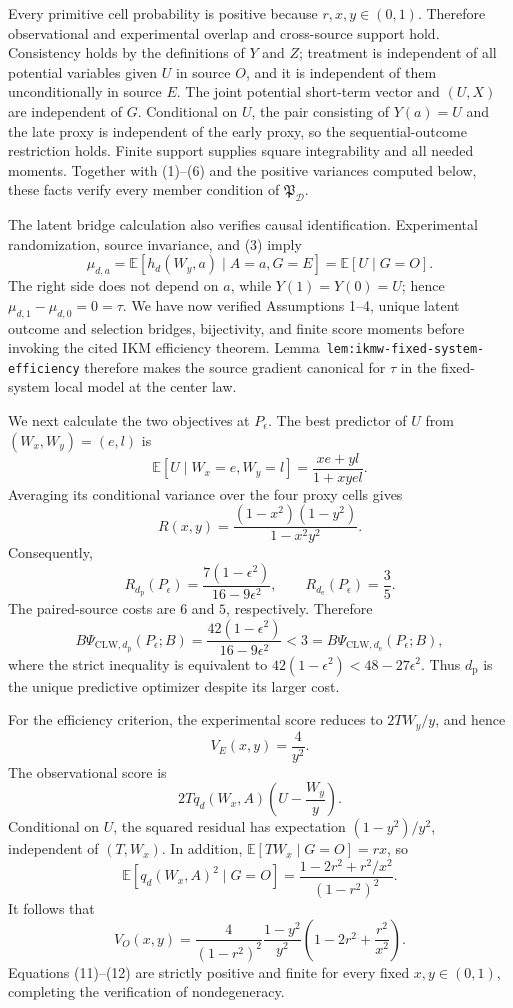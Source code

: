 Every primitive cell probability is positive because \(r,x,y\in(0,1)\).  Therefore observational and experimental overlap and cross-source support hold.  Consistency holds by the definitions of \(Y\) and \(Z\); treatment is independent of all potential variables given \(U\) in source \(O\), and it is independent of them unconditionally in source \(E\).  The joint potential short-term vector and \((U,X)\) are independent of \(G\).  Conditional on \(U\), the pair consisting of \(Y(a)=U\) and the late proxy is independent of the early proxy, so the sequential-outcome restriction holds.  Finite support supplies square integrability and all needed moments.  Together with (1)--(6) and the positive variances computed below, these facts verify every member condition of \(\mathfrak P_{\mathcal D}\).

The latent bridge calculation also verifies causal identification.  Experimental randomization, source invariance, and (3) imply
\[
 \mu_{d,a}=\mathbb E[h_d(W_y,a)\mid A=a,G=E]
 =\mathbb E[U\mid G=O]. \tag{7}
\]
The right side does not depend on \(a\), while \(Y(1)=Y(0)=U\); hence \(\mu_{d,1}-\mu_{d,0}=0=\tau\).  We have now verified Assumptions 1--4, unique latent outcome and selection bridges, bijectivity, and finite score moments before invoking the cited IKM efficiency theorem.  Lemma~\texttt{lem:ikmw-fixed-system-efficiency} therefore makes the source gradient canonical for \(\tau\) in the fixed-system local model at the center law.

We next calculate the two objectives at \(P_\epsilon\).  The best predictor of \(U\) from \((W_x,W_y)=(e,l)\) is
\[
 \mathbb E[U\mid W_x=e,W_y=l]
 =\frac{xe+yl}{1+xyel}.
\]
Averaging its conditional variance over the four proxy cells gives
\[
 R(x,y)=\frac{(1-x^2)(1-y^2)}{1-x^2y^2}. \tag{8}
\]
Consequently,
\[
 R_{d_{\mathrm p}}(P_\epsilon)
 =\frac{7(1-\epsilon^2)}{16-9\epsilon^2},
 \qquad
 R_{d_{\mathrm e}}(P_\epsilon)=\frac35. \tag{9}
\]
The paired-source costs are \(6\) and \(5\), respectively.  Therefore
\[
 B\Psi_{\mathrm{CLW},d_{\mathrm p}}(P_\epsilon;B)
 =\frac{42(1-\epsilon^2)}{16-9\epsilon^2}
 <3
 =B\Psi_{\mathrm{CLW},d_{\mathrm e}}(P_\epsilon;B), \tag{10}
\]
where the strict inequality is equivalent to \(42(1-\epsilon^2)<48-27\epsilon^2\).  Thus \(d_{\mathrm p}\) is the unique predictive optimizer despite its larger cost.

For the efficiency criterion, the experimental score reduces to \(2TW_y/y\), and hence
\[
 V_E(x,y)=\frac4{y^2}. \tag{11}
\]
The observational score is
\[
 2Tq_d(W_x,A)\left(U-\frac{W_y}{y}\right).
\]
Conditional on \(U\), the squared residual has expectation \((1-y^2)/y^2\), independent of \((T,W_x)\).  In addition, \(\mathbb E[TW_x\mid G=O]=rx\), so
\[
 \mathbb E[q_d(W_x,A)^2\mid G=O]
 =\frac{1-2r^2+r^2/x^2}{(1-r^2)^2}.
\]
It follows that
\[
 V_O(x,y)=
 \frac4{(1-r^2)^2}\frac{1-y^2}{y^2}
 \left(1-2r^2+\frac{r^2}{x^2}\right). \tag{12}
\]
Equations (11)--(12) are strictly positive and finite for every fixed \(x,y\in(0,1)\), completing the verification of nondegeneracy.

